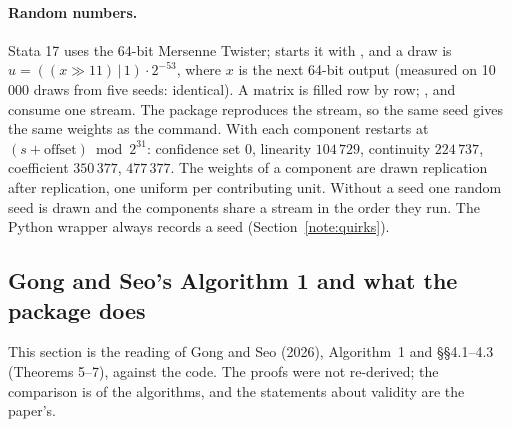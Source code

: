 \paragraph{Random numbers.} Stata 17 uses the 64-bit Mersenne Twister;  starts it with
, and a draw is $u=((x\gg11)\,|\,1)\cdot2^{-53}$, where $x$ is the next 64-bit output
(measured on 10\,000 draws from five seeds: identical). A matrix is filled row by row;
,  and  consume one stream. The package reproduces
the stream, so the same seed gives the same weights as the command. With  each component restarts
at $(s+\text{offset})\bmod2^{31}$: confidence set $0$, linearity $104\,729$, continuity $224\,737$, coefficient
$350\,377$,  $477\,377$. The weights of a component are drawn replication after replication,
one uniform per contributing unit. Without a seed one random seed is drawn and the components share a
stream in the order they run. The Python wrapper always records a seed (Section~\ref{note:quirks}).

\subsection{Gong and Seo's Algorithm 1 and what the package does}\label{note:gs}

This section is the reading of Gong and Seo (2026), Algorithm~1 and \S\S4.1--4.3 (Theorems 5--7), against the code.
The proofs were not re-derived; the comparison is of the algorithms, and the statements about validity are the
paper's.


